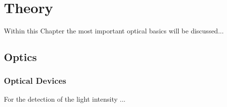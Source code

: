 %
%
\chapter{Theory}
\label{Ch:Theory}	
%
%
Within this Chapter the most important optical basics will be discussed...
%

%
\section{Optics}
%
%
%
\subsection{Optical Devices}

%
For the detection of the light intensity ...
